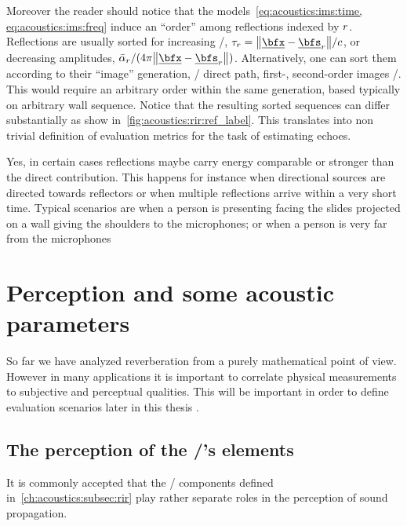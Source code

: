 
\mynewline
Moreover the reader should notice that the models~\eqref{eq:acoustics:ims:time, eq:acoustics:ims:freq} induce an ``order'' among reflections indexed by $r$.
Reflections are usually sorted for increasing \TOA/, $\tau_r = \norm{\positionMicrophone - \positionSource_\idxEch}/\speedOfSound$,
or decreasing amplitudes, $\bar{\absCoeff}_{\idxEch}/(4 \pi \norm{\positionMicrophone - \positionSource_\idxEch})$.
Alternatively, one can sort them according to their ``image'' generation, \eg/ direct path, first-, second-order images \etc/.
This would require an arbitrary order within the same generation, based typically on arbitrary wall sequence.
Notice that the resulting sorted sequences can differ substantially as show in~\cref{fig:acoustics:rir:ref_label}.
This translates into non trivial definition of evaluation metrics for the task of estimating echoes.

 Yes, in certain cases reflections maybe carry energy comparable or stronger than the direct contribution.
This happens for instance when directional sources are directed towards reflectors or when multiple reflections arrive within a very short time.
Typical scenarios are when a person is presenting facing the slides projected on a wall giving the shoulders to the microphones; or when a person is very far from the microphones


\section{Perception and some acoustic parameters}\label{ch:acoustics:sec:perception}
So far we have analyzed reverberation from a purely mathematical point of view.
However in many applications it is important to correlate physical measurements to subjective and perceptual qualities.
This will be important in order to define evaluation scenarios later in this thesis
.
\subsection{The perception of the \RIR/'s elements}
It is commonly accepted that the \RIR/ components defined in~\cref{ch:acoustics:subsec:rir} play rather separate roles in the perception of sound propagation.

